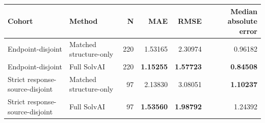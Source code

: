 \begin{tabular}{llrrrr}
\toprule
Cohort & Method & N & MAE & RMSE & Median absolute error \\
\midrule
Endpoint-disjoint & Matched structure-only & 220 & 1.53165 & 2.30974 & 0.96182 \\
Endpoint-disjoint & Full SolvAI & 220 & \textbf{1.15255} & \textbf{1.57723} & \textbf{0.84508} \\
Strict response-source-disjoint & Matched structure-only & 97 & 2.13830 & 3.08051 & \textbf{1.10237} \\
Strict response-source-disjoint & Full SolvAI & 97 & \textbf{1.53560} & \textbf{1.98792} & 1.24392 \\
\bottomrule
\end{tabular}
